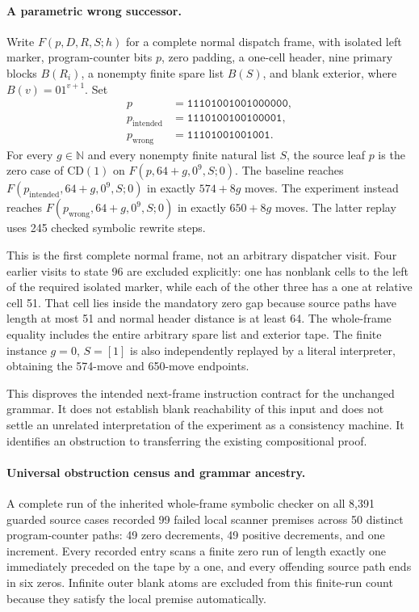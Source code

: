 \paragraph{A parametric wrong successor.}
Write $F(p,D,R,S;h)$ for a complete normal dispatch frame, with isolated
left marker, program-counter bits $p$, zero padding, a one-cell header,
nine primary blocks $B(R_i)$, a nonempty finite spare list $B(S)$, and
blank exterior, where $B(v)=01^{v+1}$.  Set
\[
\begin{split}
p&=\texttt{11101001001000000},\\
p_{\mathrm{intended}}&=\texttt{1110100100100001},\\
p_{\mathrm{wrong}}&=\texttt{11101001001001}.
\end{split}
\]
For every $g\in\mathbb N$ and every nonempty finite natural list $S$,
the source leaf $p$ is the zero case of $\mathrm{CD}(1)$ on
$F(p,64+g,0^9,S;0)$.  The baseline reaches
$F(p_{\mathrm{intended}},64+g,0^9,S;0)$ in exactly $574+8g$ moves.
The experiment instead reaches
$F(p_{\mathrm{wrong}},64+g,0^9,S;0)$ in exactly $650+8g$ moves.
The latter replay uses 245 checked symbolic rewrite steps.

This is the first complete normal frame, not an arbitrary dispatcher
visit.  Four earlier visits to state 96 are excluded explicitly: one
has nonblank cells to the left of the required isolated marker, while
each of the other three has a one at relative cell 51.  That cell lies
inside the mandatory zero gap because source paths have length at most
51 and normal header distance is at least 64.  The whole-frame equality
includes the entire arbitrary spare list and exterior tape.  The finite
instance $g=0$, $S=[1]$ is also independently replayed by a literal
interpreter, obtaining the 574-move and 650-move endpoints.

This disproves the intended next-frame instruction contract for the
unchanged grammar.  It does not establish blank reachability of this
input and does not settle an unrelated interpretation of the experiment
as a consistency machine.  It identifies an obstruction to transferring
the existing compositional proof.

\paragraph{Universal obstruction census and grammar ancestry.}
A complete run of the inherited whole-frame symbolic checker on all
8,391 guarded source cases recorded 99 failed local scanner premises
across 50 distinct program-counter paths: 49 zero decrements, 49 positive
decrements, and one increment.  Every recorded entry scans a finite
zero run of length exactly one immediately preceded on the tape by a
one, and every offending source path ends in six zeros.  Infinite outer
blank atoms are excluded from this finite-run count because they satisfy
the local premise automatically.

